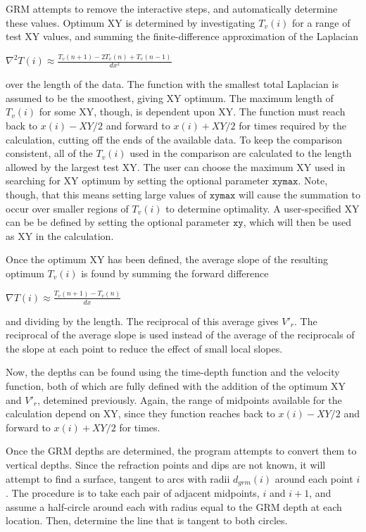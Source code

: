 {GRM attempts to remove
the interactive steps, and automatically determine these values.
Optimum XY is determined by investigating $T_{v}(i)$ for a range of test XY values,
and summing the finite-difference approximation of the Laplacian 
	\begin{center}
	\(\nabla^{2} T(i)\approx \displaystyle{\frac{T_{v}(n+1) - 2T_{v}(n) + T_{v}(n-1)}
	       {dx^{2}}} \)
	\end{center}
over the length of the data.  The function with the smallest total Laplacian
is assumed to be the smoothest, giving XY optimum.  The maximum length of $T_{v}(i)$
for some XY, though, is dependent upon XY.
The function must reach back to $x(i)-XY/2$ and forward to $x(i)+XY/2$ for times 
required by the calculation, cutting off the ends of the available data.
To keep the comparison consistent, all of the $T_{v}(i)$
used in the comparison are calculated to the length allowed by the largest
test XY.  The user can choose the maximum XY used in searching for XY optimum
by setting the optional parameter $\texttt{xymax}$.  Note, though, that
this means setting large values of $\texttt{xymax}$ will cause the summation
to occur over smaller regions of $T_{v}(i)$ to determine optimality.  A user-specified
XY can be be defined by setting the optional parameter
$\texttt{xy}$, which 
will then be used as XY in the calculation.  

Once the optimum XY has been defined, the average slope of the resulting optimum 
$T_{v}(i)$ is found by summing the forward difference
	\begin{center}
	\(\nabla T(i) \approx \displaystyle{\frac{T_{v}(n+1) - T_{v}(n)}{dx}}    \)
	\end{center}
and dividing by the length.  The reciprocal of this average gives $V'_{r}$.
The reciprocal of the average slope is used instead of the average of the 
reciprocals of the slope at each point to reduce the effect of small local
slopes. 

Now, the depths can be found using the time-depth function and the velocity
function, both of which are fully defined with the addition of the optimum XY
and $V'_{r}$, detemined previously.  Again, the range of midpoints available for
the calculation depend on XY, since they function reaches back to $x(i)-XY/2$
and forward to $x(i)+XY/2$ for times.

Once the GRM depths are determined, the program attempts to convert them
to vertical depths.  Since the refraction points and dips are not known,
it will attempt to 
find a surface, tangent to arcs with radii $d_{grm}(i)$ around each point $i$.
The procedure is to take each pair of adjacent midpoints, $i$ and $i+1$, and 
assume a half-circle around each with radius equal to the GRM depth at 
each location.  Then, determine the line that is tangent to both circles.

}
